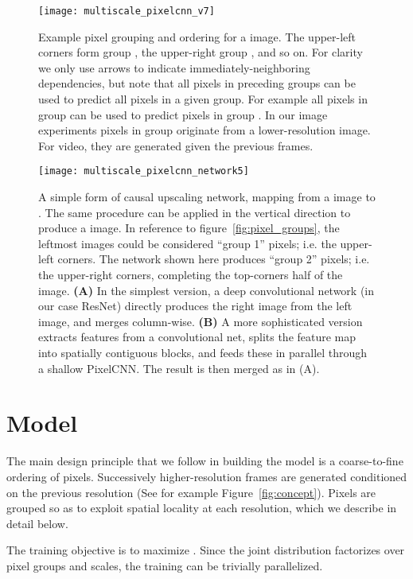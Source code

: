 \documentclass{article}
\begin{document}
\begin{figure*}[t!]
\centering
\texttt{[image: multiscale\_pixelcnn\_v7]}
\vspace{-0.1in}
\caption{Example pixel grouping and ordering for a  image. The upper-left corners form group , the upper-right group , and so on. For clarity we only use arrows to indicate immediately-neighboring dependencies, but note that all pixels in preceding groups can be used to predict all pixels in a given group. For example all pixels in group   can be used to predict pixels in group . In our image experiments pixels in group  originate from a lower-resolution image. For video, they are generated given the previous frames.\label{fig:pixel_groups}}
\vspace{0.15in}
\texttt{[image: multiscale\_pixelcnn\_network5]}
\vspace{-0.2in}
\caption{A simple form of causal upscaling network, mapping from a  image to . The same procedure can be applied in the vertical direction to produce a  image. In reference to figure~\ref{fig:pixel_groups}, the leftmost images could be considered ``group 1'' pixels; i.e. the upper-left corners. The network shown here produces ``group 2'' pixels; i.e. the upper-right corners, completing the top-corners half of the image. \textbf{(A)} In the simplest version, a deep convolutional network (in our case ResNet) directly produces the right image from the left image, and merges column-wise. \textbf{(B)} A more sophisticated version extracts features from a convolutional net, splits the feature map into spatially contiguous blocks, and feeds these in parallel through a shallow PixelCNN. The result is then merged as in (A).\label{fig:upscaling_network}}
\vspace{-0.1in}
\end{figure*}
\section{Model}
\label{sec:model}


The main design principle that we follow in building the model is a coarse-to-fine ordering of pixels.
Successively higher-resolution frames are generated conditioned on the previous resolution (See for example Figure~\ref{fig:concept}).
Pixels are grouped so as to exploit spatial locality at each resolution, which we describe in detail below.


The training objective is to maximize .
Since the joint distribution factorizes over pixel groups and scales, the training can be trivially parallelized.
\end{document}
